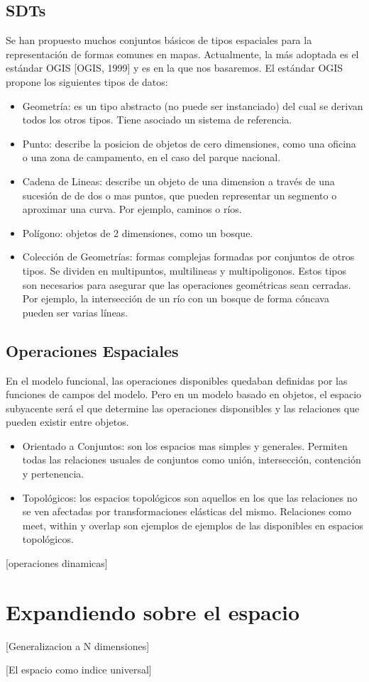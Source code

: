 \subsection{SDTs}
Se han propuesto muchos conjuntos básicos de tipos espaciales para la representación de formas comunes en mapas. Actualmente, la más adoptada es el estándar OGIS [OGIS, 1999] y es en la que nos basaremos.
El estándar OGIS propone los siguientes tipos de datos:
\begin{itemize}
    \item Geometría: es un tipo abstracto (no puede ser instanciado) del cual se derivan todos los otros tipos. Tiene asociado un sistema de referencia.
    \item Punto: describe la posicion de objetos de cero dimensiones, como una oficina o una zona de campamento, en el caso del parque nacional.
    \item Cadena de Lineas: describe un objeto de una dimension a través de una sucesión de de dos o mas puntos, que pueden representar un segmento o aproximar una curva. Por ejemplo, caminos o ríos.
    \item Polígono: objetos de 2 dimensiones, como un bosque.
    \item Colección de Geometrías: formas complejas formadas por conjuntos de otros tipos. Se dividen en multipuntos, multilineas y multipoligonos. Estos tipos son necesarios para asegurar que las operaciones geométricas sean cerradas. Por ejemplo, la intersección de un río con un bosque de forma cóncava pueden ser varias líneas.
\end{itemize}

\subsection{Operaciones Espaciales}

En el modelo funcional, las operaciones disponibles quedaban definidas por las funciones de campos del modelo. Pero en un modelo basado en objetos, el espacio subyacente será el que determine las operaciones disponsibles y las relaciones que pueden existir entre objetos. 

\begin{itemize}
    \item Orientado a Conjuntos: son los espacios mas simples y generales. Permiten todas las relaciones usuales de conjuntos como unión, intersección, contención y pertenencia.
    \item Topológicos: los espacios topológicos son aquellos en los que las relaciones no se ven afectadas por transformaciones elásticas del mismo. Relaciones como meet, within y overlap son ejemplos de ejemplos de las disponibles en espacios topológicos.
\end{itemize}

[operaciones dinamicas]

\section{Expandiendo sobre el espacio} \label{sec:e4}
[Generalizacion a N dimensiones]

[El espacio como indice universal]